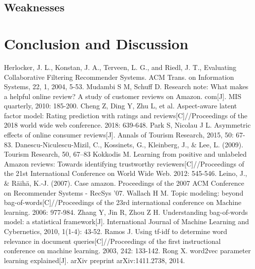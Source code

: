 \documentclass[12pt]{article}%
\begin{document}
\subsection{Weaknesses}


\section{Conclusion and Discussion}


	
\newpage
\setmainfont{Times New Roman}
\fancyhf{}
\nocite{*}		
\begin{thebibliography}{9}
	Herlocker, J. L., Konstan, J. A., Terveen, L. G., and Riedl, J. T., Evaluating Collaborative Filtering Recommender Systems. ACM Trans. on Information Systems, 22, 1, 2004, 5-53.
	Mudambi S M, Schuff D. Research note: What makes a helpful online review? A study of customer reviews on Amazon. com[J]. MIS quarterly, 2010: 185-200.
	Cheng Z, Ding Y, Zhu L, et al. Aspect-aware latent factor model: Rating prediction with ratings and reviews[C]//Proceedings of the 2018 world wide web conference. 2018: 639-648.
	Park S, Nicolau J L. Asymmetric effects of online consumer reviews[J]. Annals of Tourism Research, 2015, 50: 67-83.
	 Danescu-Niculescu-Mizil, C., Kossinets, G., Kleinberg, J., $\&$ Lee, L. (2009).
	Tourism Research, 50, 67–83
	 Kokkodis M. Learning from positive and unlabeled Amazon reviews: Towards identifying trustworthy reviewers[C]//Proceedings of the 21st International Conference on World Wide Web. 2012: 545-546.
	Leino, J., $\&$ Räihä, K.-J. (2007). Case amazon. Proceedings of the 2007 ACM Conference on Recommender Systems - RecSys ’07.
	Wallach H M. Topic modeling: beyond bag-of-words[C]//Proceedings of the 23rd international conference on Machine learning. 2006: 977-984.
	Zhang Y, Jin R, Zhou Z H. Understanding bag-of-words model: a statistical framework[J]. International Journal of Machine Learning and Cybernetics, 2010, 1(1-4): 43-52.
	Ramos J. Using tf-idf to determine word relevance in document queries[C]//Proceedings of the first instructional conference on machine learning. 2003, 242: 133-142.
	Rong X. word2vec parameter learning explained[J]. arXiv preprint arXiv:1411.2738, 2014.

\end{thebibliography}
\end{document}

